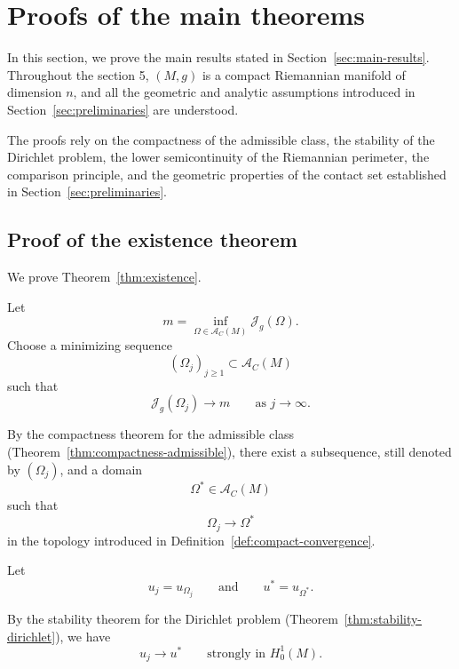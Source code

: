 \documentclass{article}
\begin{document}
\section{Proofs of the main theorems}
\label{sec:proofs}

In this section, we prove the main results stated in
Section~\ref{sec:main-results}. Throughout the section 5, $(M,g)$ is a
compact Riemannian manifold of dimension $n$, and all the geometric
and analytic assumptions introduced in
Section~\ref{sec:preliminaries} are understood.

The proofs rely on the compactness of the admissible class, the
stability of the Dirichlet problem, the lower semicontinuity of the
Riemannian perimeter, the comparison principle, and the geometric
properties of the contact set established in Section~\ref{sec:preliminaries}.


\subsection{Proof of the existence theorem}
\label{subsec:proof-existence}

We prove Theorem~\ref{thm:existence}.

Let
\[
m=
\inf_{\Omega\in\mathcal A_C(M)}
\mathcal J_g(\Omega).
\]
Choose a minimizing sequence
\[
(\Omega_j)_{j\geq1}\subset\mathcal A_C(M)
\]
such that
\begin{equation}
\mathcal J_g(\Omega_j)
\longrightarrow m
\qquad\text{as }j\to\infty.
\label{eq:minimizing-sequence}
\end{equation}

By the compactness theorem for the admissible class
(Theorem~\ref{thm:compactness-admissible}), there exist a subsequence,
still denoted by $(\Omega_j)$, and a domain
\[
\Omega^\ast\in\mathcal A_C(M)
\]
such that
\begin{equation}
\Omega_j\longrightarrow\Omega^\ast
\label{eq:domain-convergence}
\end{equation}
in the topology introduced in
Definition~\ref{def:compact-convergence}.

Let
\[
u_j=u_{\Omega_j}
\qquad\text{and}\qquad
u^\ast=u_{\Omega^\ast}.
\]

By the stability theorem for the Dirichlet problem
(Theorem~\ref{thm:stability-dirichlet}), we have
\begin{equation}
u_j\longrightarrow u^\ast
\qquad\text{strongly in }H_0^1(M).
\label{eq:strong-state-convergence}
\end{equation}
\end{document}
